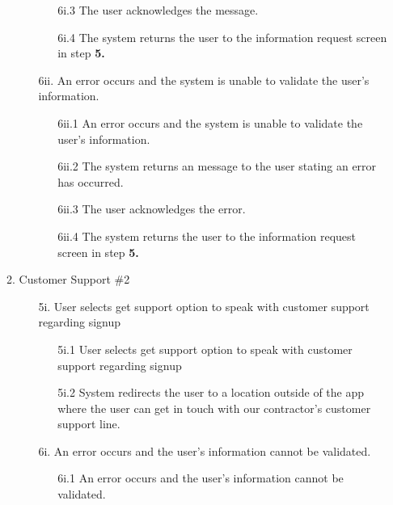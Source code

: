 \documentclass[]{article}
\begin{document}
\begin{enumerate}[label={\bf BE\arabic*.}]
\begin{enumerate}[label={\bf VP\arabic*.}]
\begin{enumerate}
\begin{enumerate}
				\item[6i.3] The user acknowledges the message.
				\item[6i.4] The system returns the user to the information request screen in step \textbf{5.}
			\end{enumerate}
			\item[6ii.] An error occurs and the system is unable to validate the user's information.
			\begin{enumerate}
				\item[6ii.1] An error occurs and the system is unable to validate the user's information.
				\item[6ii.2] The system returns an message to the user stating an error has occurred.
				\item[6ii.3] The user acknowledges the error.
				\item[6ii.4] The system returns the user to the information request screen in step \textbf{5.}
			\end{enumerate}
		\end{enumerate}
		\item Customer Support \#2			
			\begin{enumerate}
				\color{red}
				\item[5i.] User selects get support option to speak with customer support regarding signup
				\begin{enumerate}
					\item[5i.1] User selects get support option to speak with customer support regarding signup
					\item[5i.2] System redirects the user to a location outside of the app where the user can get in touch with our contractor's customer support line.
				\end{enumerate}
				\item[6i.] An error occurs and the user's information cannot be validated.
				\begin{enumerate}
					\item[6i.1] An error occurs and the user's information cannot be validated.

\end{enumerate}
\end{enumerate}
\end{enumerate}
\end{enumerate}
\end{document}
